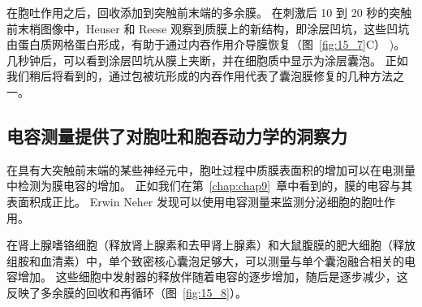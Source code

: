 在胞吐作用之后，回收添加到突触前末端的多余膜。
在刺激后 10 到 20 秒的突触前末梢图像中，Heuser 和 Reese 观察到质膜上的新结构，即涂层凹坑，这些凹坑由蛋白质网格蛋白形成，有助于通过内吞作用介导膜恢复（图~\ref{fig:15_7}C） )。
几秒钟后，可以看到涂层凹坑从膜上夹断，并在细胞质中显示为涂层囊泡。
正如我们稍后将看到的，通过包被坑形成的内吞作用代表了囊泡膜修复的几种方法之一。



\subsection{电容测量提供了对胞吐和胞吞动力学的洞察力}

在具有大突触前末端的某些神经元中，胞吐过程中质膜表面积的增加可以在电测量中检测为膜电容的增加。 
正如我们在第~\ref{chap:chap9}~章中看到的，膜的电容与其表面积成正比。
Erwin Neher 发现可以使用电容测量来监测分泌细胞的胞吐作用。


在肾上腺嗜铬细胞（释放肾上腺素和去甲肾上腺素）和大鼠腹膜的肥大细胞（释放组胺和血清素）中，单个致密核心囊泡足够大，可以测量与单个囊泡融合相关的电容增加。
这些细胞中发射器的释放伴随着电容的逐步增加，随后是逐步减少，这反映了多余膜的回收和再循环（图~\ref{fig:15_8}）。


